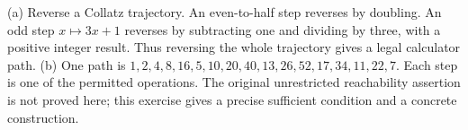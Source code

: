 (a) Reverse a Collatz trajectory. An even-to-half step reverses by doubling. An odd step $x\mapsto3x+1$ reverses by subtracting one and dividing by three, with a positive integer result. Thus reversing the whole trajectory gives a legal calculator path. (b) One path is $1,2,4,8,16,5,10,20,40,13,26,52,17,34,11,22,7$. Each step is one of the permitted operations. The original unrestricted reachability assertion is not proved here; this exercise gives a precise sufficient condition and a concrete construction.

